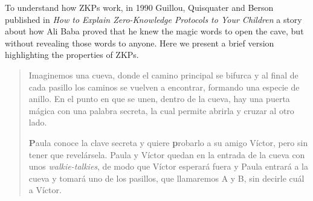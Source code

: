 To understand how ZKPs work, in 1990 Guillou, Quisquater and Berson published in \textit{How to Explain Zero-Knowledge Protocols to Your Children} \citep{ZKPcave:story} a story about how Ali Baba proved that he knew the magic words to open the cave, but without revealing those words to anyone. Here we present a brief version highlighting the properties of ZKPs.

\hfil


\begin{quote}
	Imaginemos una cueva, donde el camino principal se bifurca y al final de cada pasillo los caminos se vuelven a encontrar, formando una especie de anillo. En el punto en que se unen, dentro de la cueva, hay una puerta mágica con una palabra secreta, la cual permite abrirla y cruzar al otro lado.
	
	\textbf{P}aula conoce la clave secreta y quiere \textbf{p}robarlo a su amigo Víctor, pero sin tener que revelársela.
	Paula y Víctor quedan en la entrada de la cueva con unos \textit{walkie-talkies}, de modo que Víctor esperará fuera y Paula entrará a la cueva y tomará uno de los pasillos, que llamaremos A y B, sin decirle cuál a Víctor.
	
	

\end{quote}
